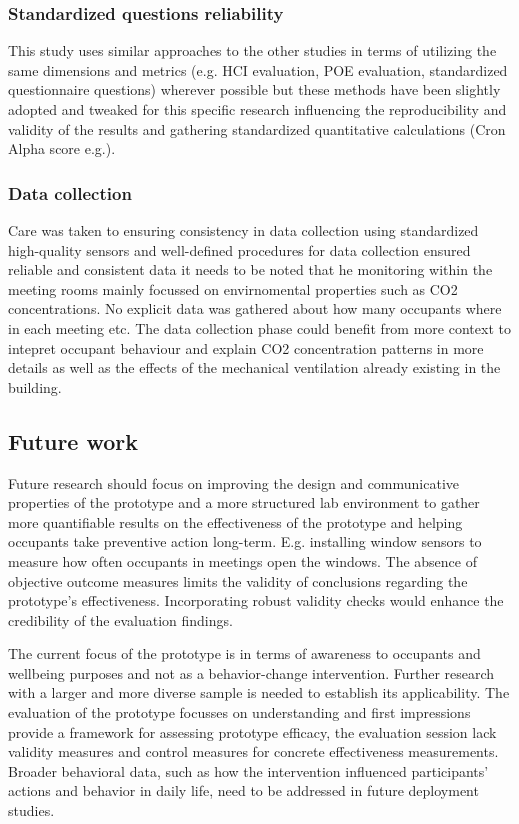 \subsubsection{Standardized questions reliability}

This study uses similar approaches to the other studies in terms of utilizing the same dimensions and metrics (e.g. HCI evaluation, POE evaluation, standardized questionnaire questions) wherever possible but these methods have been slightly adopted and tweaked for this specific research influencing the reproducibility and validity of the results and gathering standardized quantitative calculations (Cron Alpha score e.g.).

\subsubsection{Data collection}

Care was taken to ensuring consistency in data collection using standardized high-quality sensors and well-defined procedures for data collection ensured reliable and consistent data it needs to be noted that he monitoring within the meeting rooms mainly focussed on envirnomental properties such as CO2 concentrations. No explicit data was gathered about how many occupants where in each meeting etc. The data collection phase could benefit from more context to intepret occupant behaviour and explain CO2 concentration patterns in more details as well as the effects of the mechanical ventilation already existing in the building.

\subsection{Future work}

Future research should focus on improving the design and communicative properties of the prototype and a more structured lab environment to gather more quantifiable results on the effectiveness of the prototype and helping occupants take preventive action long-term. E.g. installing window sensors to measure how often occupants in meetings open the windows. The absence of objective outcome measures limits the validity of conclusions regarding the prototype's effectiveness. Incorporating robust validity checks would enhance the credibility of the evaluation findings. 

The current focus of the prototype is in terms of awareness to occupants and wellbeing purposes and not as a behavior-change intervention. Further research with a larger and more diverse sample is needed to establish its applicability. The evaluation of the prototype focusses on understanding and first impressions provide a framework for assessing prototype efficacy, the evaluation session lack validity measures and control measures for concrete effectiveness measurements. Broader behavioral data, such as how the intervention influenced participants' actions and behavior in daily life, need to be addressed in future deployment studies.


